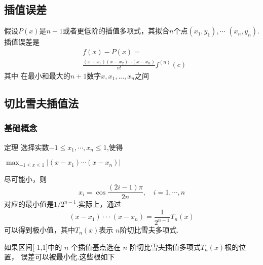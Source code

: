 \documentclass[UTF8,5pt,a4paper]{ctexart} %
\begin{document}
\begin{multicols}{4}
\subsection{插值误差}
假设$P(x)$是$n-1$或者更低阶的插值多项式，其拟合$n$个点$(x_1,y_1),\cdots$
$(x_n,y_n).$插值误差是
\begin{align*}
&f(x)-P(x)=\\
&\frac{(x-x_1)(x-x_2)\cdots(x-x_n)}{n!}f^{(n)}(c)
\end{align*}
其中 在最小和最大的$n+1$数字$x,x_1,...,x_n$之间
\subsection{切比雪夫插值法}
\subsubsection{基础概念}
定理 选择实数$-1\leqslant x_1,\cdots,x_n\leqslant1$,使得

$\max_{-1\leq x\leq1}\left|\left(x-x_{1}\right)\cdots\left(x-x_{n}\right)\right|$

尽可能小，则
$$x_i=\cos\frac{(2i-1)\pi}{2n},\quad i=1,\cdots,n$$
对应的最小值是$1/2^{n-1}.$实际上，通过
$$(x-x_1)\cdotp\cdotp\cdotp(x-x_n)=\frac1{2^{n-1}}T_n(x)$$
可以得到极小值，其中$T_n(x)$表示 $n$阶切比雪夫多项式.

如果区间[-1,1]中的 $n$ 个插值基点选在 $n$ 阶切比雪夫插值多项式$T_n(x)$根的位置，
误差可以被最小化.这些根如下


\end{multicols}
\end{document}
